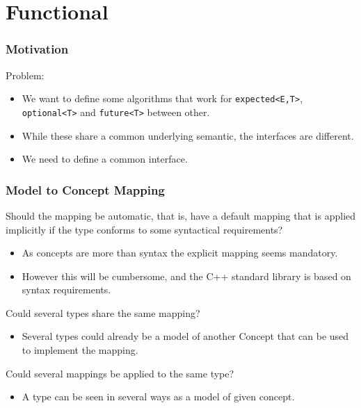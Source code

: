 \documentclass[xcolor=dvipsnames]{beamer}
\newcommand{\cpp}[1]{\lstinline{#1}}
\begin{document}
\section{Functional}
\begin{frame}[fragile]
\frametitle{Motivation}

Problem:

\begin{itemize}
  \item We want to define some algorithms that work for \cpp{expected<E,T>}, \cpp{optional<T>} and \cpp{future<T>} between other.
  \item While these share a common underlying semantic, the interfaces are different.
  \item We need to define a common interface. 
\end{itemize}

\end{frame}
\begin{frame}[fragile]
\frametitle{Model to Concept Mapping}

Should the mapping be automatic, that is, have a default mapping that is applied implicitly if the type conforms to some syntactical requirements? 

\begin{itemize}
  \item As concepts are more than syntax the explicit mapping seems mandatory. 
  \item However this will be cumbersome, and the C++ standard library is based on syntax requirements.
\end{itemize}

Could several types share the same mapping?

\begin{itemize}
  \item Several types could already be a model of another Concept that can be used to implement the mapping. 
\end{itemize}

Could several mappings be applied to the same type?

\begin{itemize}
  \item A type can be seen in several ways as a model of given concept. 
\end{itemize}


\end{frame}
\end{document}
